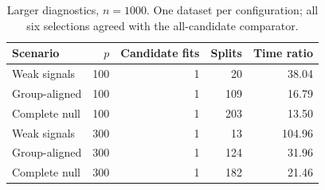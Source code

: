 \begin{table}[H]\centering\small
\begin{tabular}{lrrrr}
\toprule
Scenario & $p$ & Candidate fits & Splits & Time ratio\\
\midrule
Weak signals & 100 & 1 & 20 & 38.04\\
Group-aligned & 100 & 1 & 109 & 16.79\\
Complete null & 100 & 1 & 203 & 13.50\\
Weak signals & 300 & 1 & 13 & 104.96\\
Group-aligned & 300 & 1 & 124 & 31.96\\
Complete null & 300 & 1 & 182 & 21.46\\
\bottomrule\end{tabular}
\caption{Larger diagnostics, $n=1000$. One dataset per configuration; all six selections agreed with the all-candidate comparator.}
\end{table}
